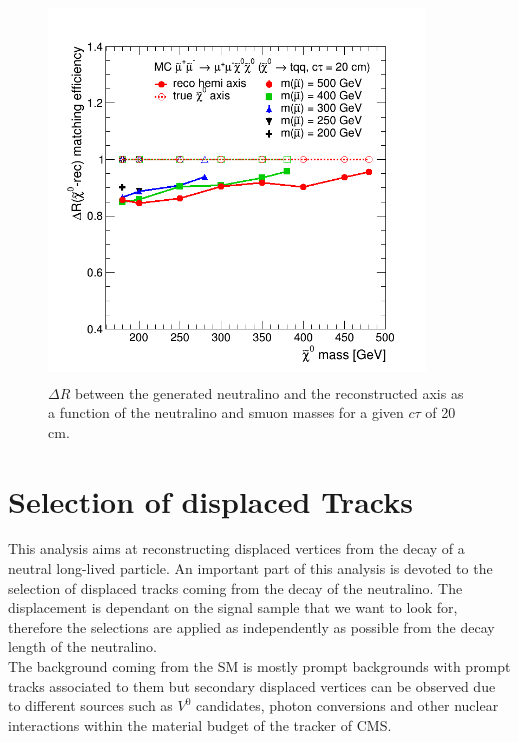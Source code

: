 \documentclass{cernatlasnote}
\begin{document}
\begin{figure}[ht]
\centering
\includegraphics[height=10cm, width=10cm, trim= 0cm 0cm 0cm 0.cm,clip]{images/Topology/eff_dR_trueaxis.png}
\caption{\label{fig:AXESQUALITY} $\Delta R$ between the generated neutralino and the reconstructed axis as a function of the neutralino and smuon masses for a given $c\tau$ of 20 cm.}
\end{figure}


\FloatBarrier
\newpage
\section{Selection of displaced Tracks}
\label{SEC: DISTRK}
    This analysis aims at reconstructing displaced vertices from the decay of a neutral long-lived particle. An important part of this analysis is devoted to the selection of displaced tracks coming from the decay of the neutralino. The displacement is dependant on the signal sample that we want to look for, therefore the selections are  applied as independently as possible from the decay length of the neutralino.\\

    The background coming from the SM is mostly prompt backgrounds with prompt tracks associated to them but secondary displaced vertices can be observed due to different sources such as $V^0$ candidates, photon conversions and other nuclear interactions within the material budget of the tracker of CMS.
\end{document}

